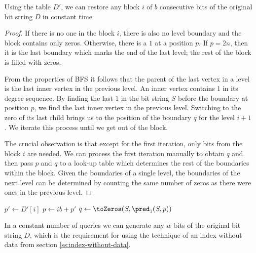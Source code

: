 \begin{lemma}
	Using the table $D'$, we can restore any block $i$ of $b$ consecutive bits of the original bit string $D$ in constant time.
\end{lemma}
\begin{proof}
	If there is no one in the block $i$, there is also no level boundary and the block contains only zeros.
	Otherwise, there is a $1$ at a position $p$.
	If $p = 2n$, then it is the last boundary which marks the end of the last level; the rest of the block is filled with zeros.

	From the properties of BFS it follows that the parent of the last vertex in a level is the last inner vertex in the previous level.
	An inner vertex contains $1$ in its degree sequence.
	By finding the last $1$ in the bit string $S$ before the boundary at position $p$, we find the last inner vertex in the previous level.
	Switching to the zero of its last child brings us to the position of the boundary $q$ for the level $i+1$.
	We iterate this process until we get out of the block.
	
	The crucial observation is that except for the first iteration, only bits from the block $i$ are needed.
	We can process the first iteration manually to obtain $q$ and then pass $p$ and $q$ to a look-up table \blockOfD{} which determines the rest of the boundaries within the block.
	Given the boundaries of a single level, the boundaries of the next level can be determined by counting the same number of zeros as there were ones in the previous level.
\end{proof}

\begin{algorithm}
\begin{algorithmic}
 
	\State $p' \gets D'[i]$
	 
		\State {}
	\Else
		\State $p \gets i b + p'$
		 
			\State {} 
		\Else
			\State $q \gets \toZeros(S, \pred_1(S, p))$
			 
				\State {}
			\Else
				\State \Return{$\blockOfD[S[i b : (i + 1) b], p', q \% b]$}
			\EndIf
		\EndIf
	\EndIf
\EndFunction
\end{algorithmic}
\end{algorithm}

In a constant number of queries we can generate any $w$ bits of the original bit string $D$, which is the requirement for using the technique of an index without data from section \ref{ss:index-without-data}.

